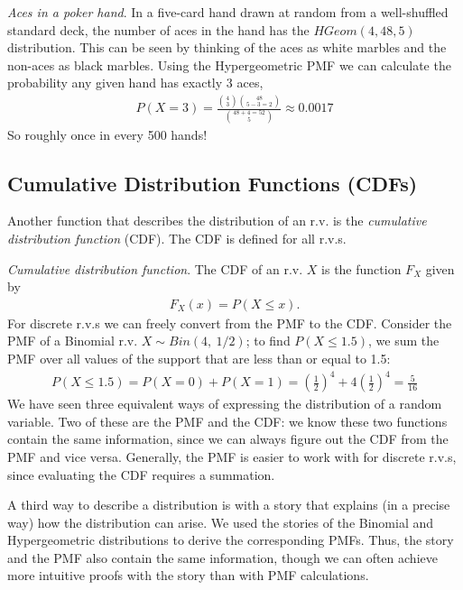 \emph{Aces in a poker hand}. 
In a five-card hand drawn at random from a well-shuffled standard deck, 
the number of aces in the hand has the \(HGeom(4,48,5)\) distribution. 
This can be seen by thinking of the aces as white marbles and the non-aces as black marbles. 
Using the Hypergeometric PMF we can calculate the probability any given hand has exactly 3 aces,
\begin{align}
P(X = 3) = \frac{\binom{4}{3}\binom{48}{5 - 3 = 2}}{\binom{48 + 4 = 52}{5}} \approx 0.0017
\end{align}
So roughly once in every 500 hands!

\subsection{Cumulative Distribution Functions (CDFs)}

Another function that describes the distribution of an r.v. is the 
\emph{cumulative distribution function} (CDF). 
The CDF is defined for all r.v.s.

\emph{Cumulative distribution function}. 
The CDF of an r.v. \(X\) is the function \(F_{X}\) given by
\begin{align}
F_{X}(x) = P(X \leq x).
\end{align}
For discrete r.v.s we can freely convert from the PMF to the CDF.
Consider the PMF of a Binomial r.v. \(X \sim Bin(4,\ 1/2)\); 
to find \(P(X \leq 1.5)\), 
we sum the PMF over all values of the support that are less than or equal to 1.5:
\begin{align}
P(X \leq 1.5) = P(X = 0) + P(X = 1) = 
\left( \frac{1}{2} \right)^{4} + 4\left( \frac{1}{2} \right)^{4} = \frac{5}{16}
\end{align}
We have seen three equivalent ways of expressing the distribution of a random variable. 
Two of these are the PMF and the CDF: 
we know these two functions contain the same information, 
since we can always figure out the CDF from the PMF and vice versa. 
Generally, the PMF is easier to work with for discrete r.v.s, 
since evaluating the CDF requires a summation.

A third way to describe a distribution is with a story that explains (in
a precise way) how the distribution can arise. 
We used the stories of
the Binomial and Hypergeometric distributions to derive the
corresponding PMFs. 
Thus, the story and the PMF also contain the same information, 
though we can often achieve more intuitive proofs with the
story than with PMF calculations.

